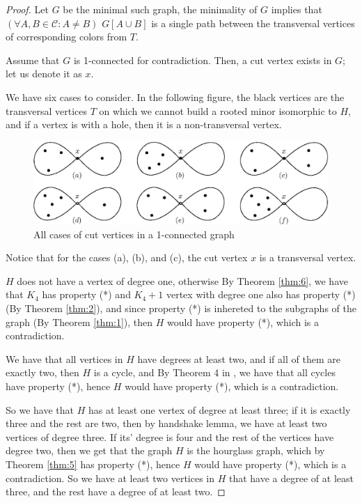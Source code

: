 \begin{proof}
 Let $G$ be the minimal such graph, the minimality of $G$ implies that $(\forall A, B \in \mathcal{C}: A \neq B)$ $G[A \cup B]$ is a single path between the transversal vertices of corresponding colors from $T$.

 Assume that $G$ is 1-connected for contradiction. Then, a cut vertex exists in $G$; let us denote it as $x$. 
    
 We have six cases to consider.
 In the following figure, the black vertices are the transversal vertices $T$ on which we cannot build a rooted minor isomorphic to $H$, and if 
 a vertex is with a hole, then it is a non-transversal vertex.
       
    \begin{figure}[h]
       \centering
       \vspace{0.3cm}
       \includegraphics[width=13cm]{img/hourglass+1-cases.eps}
       \vspace{0.3cm}
       \caption{All cases of cut vertices in a 1-connected graph}
       \label{fig:2connected_counterexamples}
   \end{figure}
   
 Notice that for the cases (a), (b), and (c), the cut vertex $x$ is a transversal vertex.
   

   $H$ does not have a vertex of degree one, otherwise By Theorem \ref{thm:6}, we have that $K_4$ has property
 (*) and $K_4 + 1$ vertex with degree one also has property (*) (By Theorem \ref{thm:2}), and since property (*) is inhereted to the subgraphs of 
 the graph (By Theorem \ref{thm:1}), then $H$ would have property (*), which is a contradiction.

 We have that all vertices in $H$ have degrees at least two, and if all of them are exactly two, then $H$ is a cycle, and By Theorem 4 in \cite{matthias_2022}, we have that
 all cycles have property (*), hence $H$ would have property (*), which is a contradiction.

 So we have that $H$ has at least one vertex of degree at least three; if it is exactly three and the rest are two, then by handshake lemma, we have at least 
 two vertices of degree three. If its' degree is four and the rest of the vertices have degree two, then we get that the graph $H$ is 
 the hourglass graph, which by Theorem \ref{thm:5} has property (*), hence $H$ would have property (*), which is a contradiction. So we have
 at least two vertices in $H$ that have a degree of at least three, and the rest have a degree of at least two.


\end{proof}

